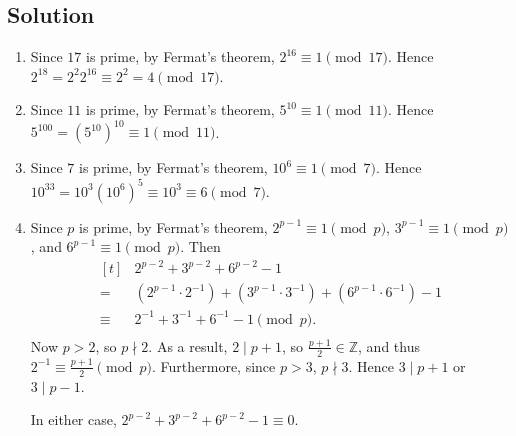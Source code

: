 \documentclass{article}
\begin{document}
\subsection*{Solution}
    \begin{enumerate}
        \item Since $17$ is prime, by Fermat's theorem, $2^{16} \equiv 1 \pmod{17}$. Hence $2^{18} = 2^{2}2^{16} \equiv 2^2 = 4 \pmod{17}$.
        \item Since $11$ is prime, by Fermat's theorem, $5^{10} \equiv 1 \pmod{11}$. Hence $5^{100} = (5^{10})^{10} \equiv 1 \pmod{11}$.
        \item Since $7$ is prime, by Fermat's theorem, $10^{6} \equiv 1 \pmod{7}$. Hence $10^{33} = 10^{3}(10^{6})^{5} \equiv 10^{3} \equiv 6 \pmod{7}$.
        \item Since $p$ is prime, by Fermat's theorem, $2^{p - 1} \equiv 1 \pmod{p}$, $3^{p - 1} \equiv 1 \pmod{p}$, and $6^{p - 1} \equiv 1 \pmod{p}$. Then
        $$\begin{aligned}[t]
            &2^{p-2} + 3^{p-2} + 6^{p-2} - 1 \\
            ={}& (2^{p - 1} \cdot 2^{-1}) + (3^{p - 1} \cdot 3^{-1}) + (6^{p - 1} \cdot 6^{-1}) - 1 \\
            \equiv{}& 2^{-1} + 3^{-1} + 6^{-1} - 1 \pmod{p}. \\
        \end{aligned}$$
        Now $p > 2$, so $p \nmid 2$. As a result, $2 \mid p + 1$, so $\frac{p + 1}{2} \in \mathbb{Z}$, and thus $2^{-1} \equiv \frac{p + 1}{2} \pmod{p}$. Furthermore, since $p > 3$, $p \nmid 3$. Hence $3 \mid p + 1$ or $3 \mid p - 1$.
        
        In either case, $2^{p-2} + 3^{p-2} + 6^{p-2} - 1 \equiv 0$.
    \end{enumerate}
\end{document}
